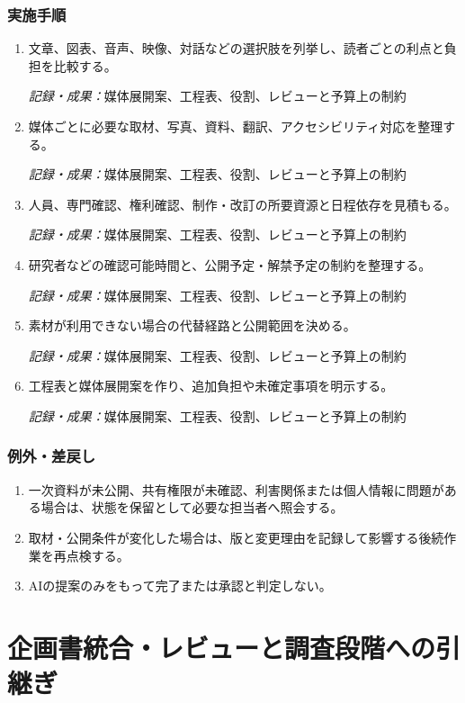 \documentclass[a4paper,11pt]{article}
\begin{document}
\subsubsection*{実施手順}
\begin{enumerate}[leftmargin=2em,itemsep=0.65em]
\item 文章、図表、音声、映像、対話などの選択肢を列挙し、読者ごとの利点と負担を比較する。\par\noindent\textit{記録・成果：}媒体展開案、工程表、役割、レビューと予算上の制約\nobreak\smallskip
\item 媒体ごとに必要な取材、写真、資料、翻訳、アクセシビリティ対応を整理する。\par\noindent\textit{記録・成果：}媒体展開案、工程表、役割、レビューと予算上の制約\nobreak\smallskip
\item 人員、専門確認、権利確認、制作・改訂の所要資源と日程依存を見積もる。\par\noindent\textit{記録・成果：}媒体展開案、工程表、役割、レビューと予算上の制約\nobreak\smallskip
\item 研究者などの確認可能時間と、公開予定・解禁予定の制約を整理する。\par\noindent\textit{記録・成果：}媒体展開案、工程表、役割、レビューと予算上の制約\nobreak\smallskip
\item 素材が利用できない場合の代替経路と公開範囲を決める。\par\noindent\textit{記録・成果：}媒体展開案、工程表、役割、レビューと予算上の制約\nobreak\smallskip
\item 工程表と媒体展開案を作り、追加負担や未確定事項を明示する。\par\noindent\textit{記録・成果：}媒体展開案、工程表、役割、レビューと予算上の制約\nobreak\smallskip
\end{enumerate}
\subsubsection*{例外・差戻し}
\begin{enumerate}[leftmargin=2em,itemsep=0.35em]
\item 一次資料が未公開、共有権限が未確認、利害関係または個人情報に問題がある場合は、状態を保留として必要な担当者へ照会する。
\item 取材・公開条件が変化した場合は、版と変更理由を記録して影響する後続作業を再点検する。
\item AIの提案のみをもって完了または承認と判定しない。
\end{enumerate}
\section{企画書統合・レビューと調査段階への引継ぎ}
\end{document}
